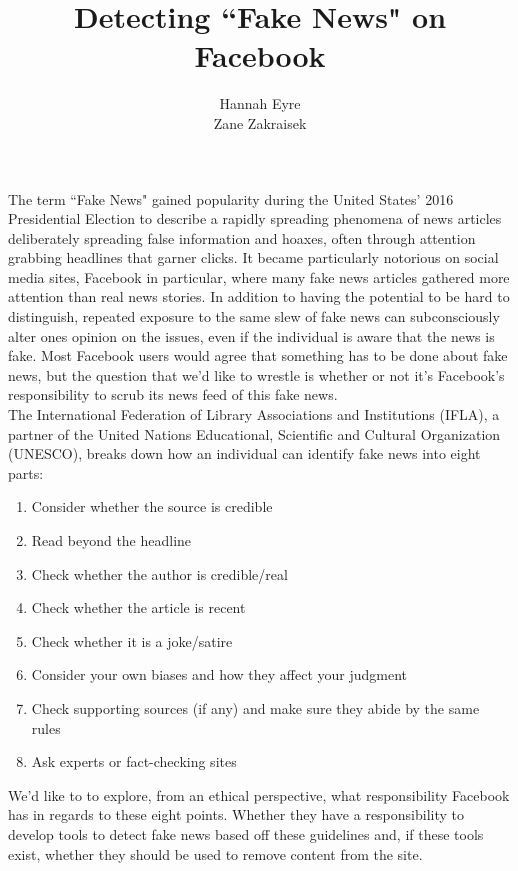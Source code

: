 \documentclass[11pt,letterpage]{article}
\title{Detecting ``Fake News" on Facebook}
\author{Hannah Eyre\\
	Zane Zakraisek}
\begin{document}
\maketitle

The term ``Fake News" gained popularity during the United States' 2016 Presidential Election to describe a rapidly spreading phenomena of news articles deliberately spreading false information and hoaxes, often through attention grabbing headlines that garner clicks. It became particularly notorious on social media sites, Facebook in particular, where many fake news articles gathered more attention than real news stories. In addition to having the potential to be hard to distinguish, repeated exposure to the same slew of fake news can subconsciously alter ones opinion on the issues, even if the individual is aware that the news is fake. Most Facebook users would agree that something has to be done about fake news, but the question that we'd like to wrestle is whether or not it's Facebook's responsibility to scrub its news feed of this fake news.\\

The International Federation of Library Associations and Institutions (IFLA), a partner of the United Nations Educational, Scientific and Cultural Organization (UNESCO), breaks down how an individual can identify fake news into eight parts:
\begin{enumerate}
\item Consider whether the source is credible
\item Read beyond the headline
\item Check whether the author is credible/real
\item Check whether the article is recent
\item Check whether it is a joke/satire
\item Consider your own biases and how they affect your judgment
\item Check supporting sources (if any) and make sure they abide by the same rules
\item Ask experts or fact-checking sites
\end{enumerate}

We'd like to to explore, from an ethical perspective, what responsibility Facebook has in regards to these eight points. Whether they have a responsibility to develop tools to detect fake news based off these guidelines and, if these tools exist, whether they should be used to remove content from the site.
\end{document}
